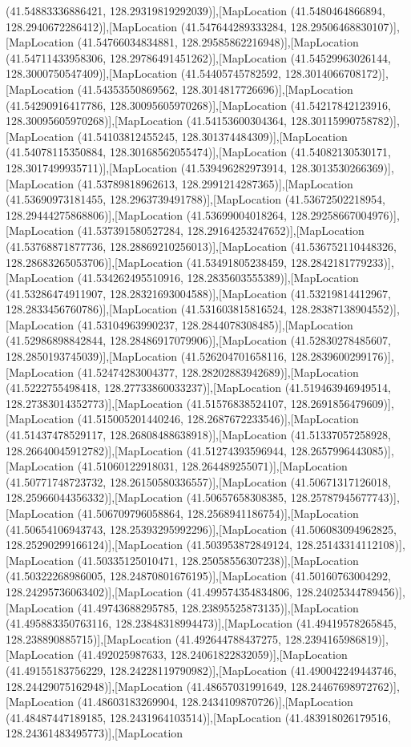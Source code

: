 (41.54883336886421, 128.29319819292039)],[MapLocation (41.5480464866894, 128.2940672286412)],[MapLocation (41.547644289333284, 128.29506468830107)],[MapLocation (41.54766034834881, 128.29585862216948)],[MapLocation (41.54711433958306, 128.29786491451262)],[MapLocation (41.54529963026144, 128.3000750547409)],[MapLocation (41.54405745782592, 128.3014066708172)],[MapLocation (41.54353550869562, 128.3014817726696)],[MapLocation (41.54290916417786, 128.30095605970268)],[MapLocation (41.54217842123916, 128.30095605970268)],[MapLocation (41.54153600304364, 128.30115990758782)],[MapLocation (41.54103812455245, 128.301374484309)],[MapLocation (41.54078115350884, 128.30168562055474)],[MapLocation (41.54082130530171, 128.3017499935711)],[MapLocation (41.539496282973914, 128.3013530266369)],[MapLocation (41.53789818962613, 128.2991214287365)],[MapLocation (41.53690973181455, 128.2963739491788)],[MapLocation (41.53672502218954, 128.29444275868806)],[MapLocation (41.53699004018264, 128.29258667004976)],[MapLocation (41.537391580527284, 128.29164253247652)],[MapLocation (41.53768871877736, 128.28869210256013)],[MapLocation (41.536752110448326, 128.28683265053706)],[MapLocation (41.53491805238459, 128.2842181779233)],[MapLocation (41.534262495510916, 128.2835603555389)],[MapLocation (41.53286474911907, 128.28321693004588)],[MapLocation (41.53219814412967, 128.2833456760786)],[MapLocation (41.531603815816524, 128.28387138904552)],[MapLocation (41.53104963990237, 128.2844078308485)],[MapLocation (41.52986898842844, 128.28486917079906)],[MapLocation (41.52830278485607, 128.2850193745039)],[MapLocation (41.526204701658116, 128.2839600299176)],[MapLocation (41.52474283004377, 128.28202883942689)],[MapLocation (41.5222755498418, 128.27733860033237)],[MapLocation (41.519463946949514, 128.27383014352773)],[MapLocation (41.51576838524107, 128.2691856479609)],[MapLocation (41.515005201440246, 128.2687672233546)],[MapLocation (41.51437478529117, 128.26808488638918)],[MapLocation (41.51337057258928, 128.26640045912782)],[MapLocation (41.51274393596944, 128.2657996443085)],[MapLocation (41.51060122918031, 128.264489255071)],[MapLocation (41.50771748723732, 128.26150580336557)],[MapLocation (41.50671317126018, 128.25966044356332)],[MapLocation (41.50657658308385, 128.25787945677743)],[MapLocation (41.506709796058864, 128.2568941186754)],[MapLocation (41.50654106943743, 128.25393295992296)],[MapLocation (41.506083094962825, 128.25290299166124)],[MapLocation (41.503953872849124, 128.25143314112108)],[MapLocation (41.50335125010471, 128.25058556307238)],[MapLocation (41.50322268986005, 128.24870801676195)],[MapLocation (41.50160763004292, 128.24295736063402)],[MapLocation (41.499574354834806, 128.24025344789456)],[MapLocation (41.49743688295785, 128.23895525873135)],[MapLocation (41.495883350763116, 128.23848318994473)],[MapLocation (41.49419578265845, 128.238890885715)],[MapLocation (41.492644788437275, 128.2394165986819)],[MapLocation (41.492025987633, 128.24061822832059)],[MapLocation (41.49155183756229, 128.24228119790982)],[MapLocation (41.490042249443746, 128.24429075162948)],[MapLocation (41.48657031991649, 128.24467698972762)],[MapLocation (41.48603183269904, 128.2434109870726)],[MapLocation (41.48487447189185, 128.2431964103514)],[MapLocation (41.483918026179516, 128.24361483495773)],[MapLocation 
